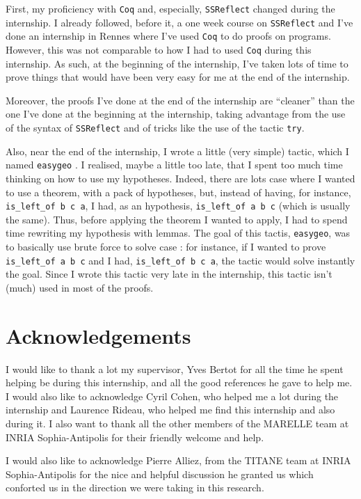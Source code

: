 \documentclass[a4paper,10pt]{article}
\begin{document}
First, my proficiency with {\tt Coq} and, especially, {\tt SSReflect} changed during the internship. I already followed, before it, a one week course on {\tt SSReflect} and I've done an internship in Rennes where I've used {\tt Coq} to do proofs on programs. However, this was not comparable to how I had to used {\tt Coq} during this internship. As such, at the beginning of the internship, I've taken lots of time to prove things that would have been very easy for me at the end of the internship.

  Moreover, the proofs I've done at the end of the internship are ``cleaner'' than the one I've done at the beginning at the internship, taking advantage from the use of the syntax of {\tt SSReflect} and of tricks like the use of the tactic {\tt try}.

  Also, near the end of the internship, I wrote a little (very simple) tactic, which I named {\tt easygeo} \label{easygeo}. I realised, maybe a little too late, that I spent too much time thinking on how to use my hypotheses. Indeed, there are lots case where I wanted to use a theorem, with a pack of hypotheses, but, instead of having, for instance, {\tt is\_left\_of b c a}, I had, as an hypothesis, {\tt is\_left\_of a b c} (which is usually the same). Thus, before applying the theorem I wanted to apply, I had to spend time rewriting my hypothesis with lemmas. The goal of this tactis, {\tt easygeo}, was to basically use brute force to solve case : for instance, if I wanted to prove {\tt is\_left\_of a b c} and I had, {\tt is\_left\_of b c a}, the tactic would solve instantly the goal. Since I wrote this tactic very late in the internship, this tactic isn't (much) used in most of the proofs.

\section{Acknowledgements}
I would like to thank a lot my supervisor, Yves Bertot for all the time he spent helping be during this internship, and all the good references he gave to help me. I would also like to acknowledge Cyril Cohen, who helped me a lot during the internship and Laurence Rideau, who helped me find this internship and also during it. I also want to thank all the other members of the MARELLE team at INRIA Sophia-Antipolis for their friendly welcome and help.

I would also like to acknowledge Pierre Alliez, from the TITANE team at INRIA Sophia-Antipolis for the nice and helpful discussion he granted us which conforted us in the direction we were taking in this research.

\newpage


\end{document}
